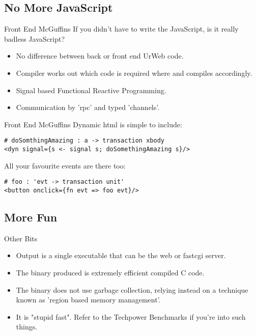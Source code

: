 \documentclass{beamer}
\begin{document}
\subsection{No More JavaScript}
\begin{frame}{Front End McGuffins}
If you didn't have to write the JavaScript, is it really badless JavaScript?\\

\begin{itemize}
\item No difference between back or front end UrWeb code.
\item Compiler works out which code is required where and compiles accordingly.
\item Signal based Functional Reactive Programming.
\item Communication by 'rpc' and typed 'channels'.
\end{itemize}
\end{frame}

\begin{frame}[fragile]{Front End McGuffins}
Dynamic html is simple to include:
\begin{verbatim}
# doSomthingAmazing : a -> transaction xbody
<dyn signal={s <- signal s; doSomethingAmazing s}/>
\end{verbatim}
All your favourite events are there too:
\begin{verbatim}
# foo : 'evt -> transaction unit'
<button onclick={fn evt => foo evt}/>
\end{verbatim}
\end{frame}

\subsection{More Fun}
\begin{frame}[fragile]{Other Bits}

\begin{itemize}
\item Output is a single executable that can be the web or fastcgi server.
\item The binary produced is extremely efficient compiled C code.
\item The binary does not use garbage collection, relying instead on a technique known as 'region based memory management'.
\item It is "stupid fast". Refer to the Techpower Benchmarks if you're into such things.
\end{itemize}
\end{frame}
\end{document}
